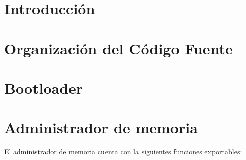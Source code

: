 \documentclass[a4paper,10pt]{article}
\begin{document}
\tableofcontents

\newpage


\section*{Introducci\'on}


\section*{Organizaci\'on del C\'odigo Fuente}


\section*{Bootloader}


\section*{Administrador de memoria}
El administrador de memoria cuenta con la siguientes funciones exportables:
\end{document}
